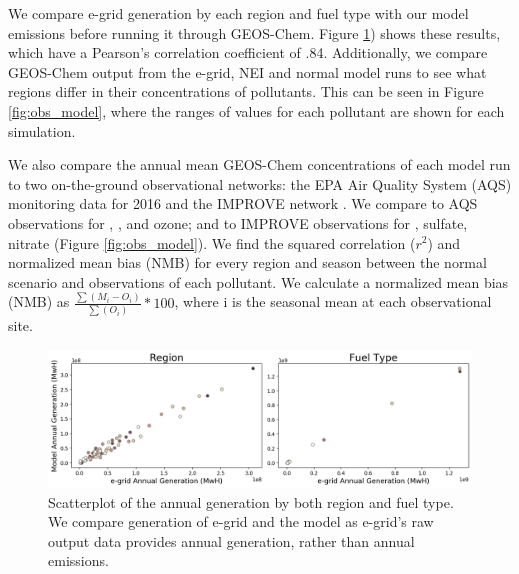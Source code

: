 \documentclass[12]{article}
\begin{document}
We compare e-grid generation by each region and fuel type with our model emissions before running it through GEOS-Chem. 
Figure \ref{fig:emissions_region}) shows these results, which have a Pearson's correlation coefficient of .84. Additionally, we compare GEOS-Chem output from the e-grid, NEI and normal model runs to see what regions differ in their concentrations of pollutants. This can be seen in Figure \ref{fig:obs_model}, where the ranges of values for each pollutant are shown for each simulation.

We also compare the annual mean GEOS-Chem concentrations of each model run to two on-the-ground observational networks: the EPA Air Quality System (AQS) monitoring data for 2016 \citep{us_epa_daily_2016} and the IMPROVE network \citep{malm_spatial_1994}. We compare to AQS observations for , ,  and ozone; and to IMPROVE observations for , sulfate, nitrate (Figure \ref{fig:obs_model}). We find the squared correlation ($r^2$) and normalized mean bias (NMB) for every region and season between the normal scenario and observations of each pollutant. We calculate a normalized mean bias (NMB) as $\frac{\sum(M_i - O_i)}{\sum(O_i)}*100$, where i is the seasonal mean at each observational site.


\begin{figure}
    \centering
    \includegraphics[scale=0.3]{ego_nonuclear_project/Figures/egrid_model.png}
    \caption{Scatterplot of the annual generation by both region and fuel type. We compare generation of e-grid and the model as e-grid's raw output data provides annual generation, rather than annual emissions.} 
    \label{fig:emissions_region}
\end{figure}
\end{document}
